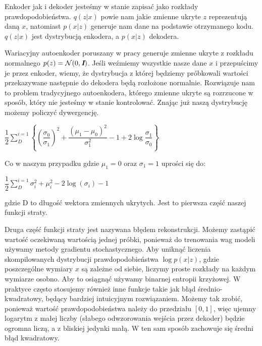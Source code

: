 \documentclass[a4paper,12pt]{book} %
\begin{document}
Enkoder jak i dekoder jesteśmy w stanie zapisać jako rozkłady prawdopodobieństwa. $q(z|x)$ powie nam jakie zmienne ukryte $z$ reprezentują daną $x$, natomiast $p(x|z)$ generuje nam dane na podstawie otrzymanego kodu. $q(z|x)$ jest dystrybucją enkodera, a $p(x|z)$ dekodera.

Wariacyjny autoenkoder poruszany w pracy generuje zmienne ukryte z rozkładu normalnego $p(z)=\mathcal{N}(0,\textit{\textbf{I}})$. Jeśli weźmiemy wszystkie nasze dane $x$ i przepuścimy je przez enkoder, wiemy, że dystrybucja z której będziemy próbkowali wartości przekazywane następnie do dekodera będą rozłożone normalnie. Rozwiązuje nam to problem tradycyjnego autoenkodera, którego zmienne ukryte są rozrzucone w sposób, który nie jesteśmy w stanie kontrolować. Znając już naszą dystrybucję możemy policzyć dywergencję.
\begin{center}
	$\dfrac{1}{2}\displaystyle\sum_{D}^{i=1}\left\{\left(\dfrac{\sigma_0}{\sigma_1}\right)^2+\dfrac{(\mu_1 - \mu_0)^2}{\sigma_1^2} - 1 + 2\log\dfrac{\sigma_1}{\sigma_0}\right\}$
\end{center}
Co w naszym przypadku gdzie $\mu_1 = 0$ oraz $\sigma_1=1$ uprości się do:
\begin{center}
	$\dfrac{1}{2}\displaystyle\sum_{D}^{i=1}\sigma_i^2+\mu_i^2-2\log(\sigma_i)-1$
\end{center} 
gdzie D to długość wektora zmiennych ukrytych. Jest to pierwsza część naszej funkcji straty. 

Druga część funkcji straty jest nazywana błędem rekonstrukcji. Możemy zastąpić wartość oczekiwaną wartością jednej próbki, ponieważ do trenowania wag modeli używamy metody gradientu stochastycznego. Aby uniknąć liczenia skompilowanych dystrybucji prawdopodobieństwa $\log p(x|z)$, gdzie poszczególne wymiary $x$ są zależne od siebie, liczymy proste rozkłady na każdym wymiarze osobno. Aby to osiągnąć używamy binarnej entropii krzyżowej. W praktyce często stosujemy również inne funkcje takie jak błąd średnio-kwadratowy, będący bardziej intuicyjnym rozwiązaniem.
Możemy tak zrobić, ponieważ wartość prawdopodobieństwa należy do przedziału $\left[ 0, 1\right] $, więc ujemny logarytm z małej liczby (słabego odwzorowania wejścia przez dekoder) będzie ogromna liczą, a z bliskiej jedynki małą. W ten sam sposób zachowuje się średni błąd kwadratowy.
\newpage
\end{document}
